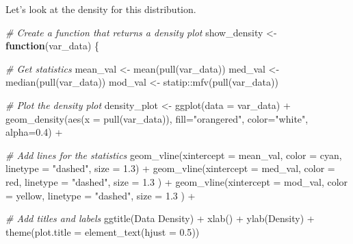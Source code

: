 \documentclass[
]{article}
\newenvironment{Shaded}{\begin{snugshade}}{\end{snugshade}}
\newcommand{\AttributeTok}[1]{\textcolor[rgb]{0.77,0.63,0.00}{#1}}
\newcommand{\CommentTok}[1]{\textcolor[rgb]{0.56,0.35,0.01}{\textit{#1}}}
\newcommand{\ControlFlowTok}[1]{\textcolor[rgb]{0.13,0.29,0.53}{\textbf{#1}}}
\newcommand{\FloatTok}[1]{\textcolor[rgb]{0.00,0.00,0.81}{#1}}
\newcommand{\FunctionTok}[1]{\textcolor[rgb]{0.00,0.00,0.00}{#1}}
\newcommand{\NormalTok}[1]{#1}
\newcommand{\OtherTok}[1]{\textcolor[rgb]{0.56,0.35,0.01}{#1}}
\newcommand{\SpecialCharTok}[1]{\textcolor[rgb]{0.00,0.00,0.00}{#1}}
\newcommand{\StringTok}[1]{\textcolor[rgb]{0.31,0.60,0.02}{#1}}
\begin{document}
Let's look at the density for this distribution.

\begin{Shaded}
\begin{Highlighting}[]
\CommentTok{\# Create a function that returns a density plot}
\NormalTok{show\_density }\OtherTok{\textless{}{-}} \ControlFlowTok{function}\NormalTok{(var\_data) \{}
  
  \CommentTok{\# Get statistics}
\NormalTok{  mean\_val }\OtherTok{\textless{}{-}} \FunctionTok{mean}\NormalTok{(}\FunctionTok{pull}\NormalTok{(var\_data))}
\NormalTok{  med\_val }\OtherTok{\textless{}{-}} \FunctionTok{median}\NormalTok{(}\FunctionTok{pull}\NormalTok{(var\_data))}
\NormalTok{  mod\_val }\OtherTok{\textless{}{-}}\NormalTok{ statip}\SpecialCharTok{::}\FunctionTok{mfv}\NormalTok{(}\FunctionTok{pull}\NormalTok{(var\_data))}
  
  
  \CommentTok{\# Plot the density plot}
\NormalTok{  density\_plot }\OtherTok{\textless{}{-}} \FunctionTok{ggplot}\NormalTok{(}\AttributeTok{data =}\NormalTok{ var\_data) }\SpecialCharTok{+}
  \FunctionTok{geom\_density}\NormalTok{(}\FunctionTok{aes}\NormalTok{(}\AttributeTok{x =} \FunctionTok{pull}\NormalTok{(var\_data)), }\AttributeTok{fill=}\StringTok{"orangered"}\NormalTok{, }\AttributeTok{color=}\StringTok{"white"}\NormalTok{, }\AttributeTok{alpha=}\FloatTok{0.4}\NormalTok{) }\SpecialCharTok{+}
    
  \CommentTok{\# Add lines for the statistics}
  \FunctionTok{geom\_vline}\NormalTok{(}\AttributeTok{xintercept =}\NormalTok{ mean\_val, }\AttributeTok{color =} \StringTok{\textquotesingle{}cyan\textquotesingle{}}\NormalTok{, }\AttributeTok{linetype =} \StringTok{"dashed"}\NormalTok{, }\AttributeTok{size =} \FloatTok{1.3}\NormalTok{) }\SpecialCharTok{+}
  \FunctionTok{geom\_vline}\NormalTok{(}\AttributeTok{xintercept =}\NormalTok{ med\_val, }\AttributeTok{color =} \StringTok{\textquotesingle{}red\textquotesingle{}}\NormalTok{, }\AttributeTok{linetype =} \StringTok{"dashed"}\NormalTok{, }\AttributeTok{size =} \FloatTok{1.3}\NormalTok{ ) }\SpecialCharTok{+}
  \FunctionTok{geom\_vline}\NormalTok{(}\AttributeTok{xintercept =}\NormalTok{ mod\_val, }\AttributeTok{color =} \StringTok{\textquotesingle{}yellow\textquotesingle{}}\NormalTok{, }\AttributeTok{linetype =} \StringTok{"dashed"}\NormalTok{, }\AttributeTok{size =} \FloatTok{1.3}\NormalTok{ ) }\SpecialCharTok{+}
    
  \CommentTok{\# Add titles and labels}
  \FunctionTok{ggtitle}\NormalTok{(}\StringTok{\textquotesingle{}Data Density\textquotesingle{}}\NormalTok{) }\SpecialCharTok{+}
  \FunctionTok{xlab}\NormalTok{(}\StringTok{\textquotesingle{}\textquotesingle{}}\NormalTok{) }\SpecialCharTok{+}
  \FunctionTok{ylab}\NormalTok{(}\StringTok{\textquotesingle{}Density\textquotesingle{}}\NormalTok{) }\SpecialCharTok{+}
  \FunctionTok{theme}\NormalTok{(}\AttributeTok{plot.title =} \FunctionTok{element\_text}\NormalTok{(}\AttributeTok{hjust =} \FloatTok{0.5}\NormalTok{))}
  

\end{Highlighting}
\end{Shaded}
\end{document}
